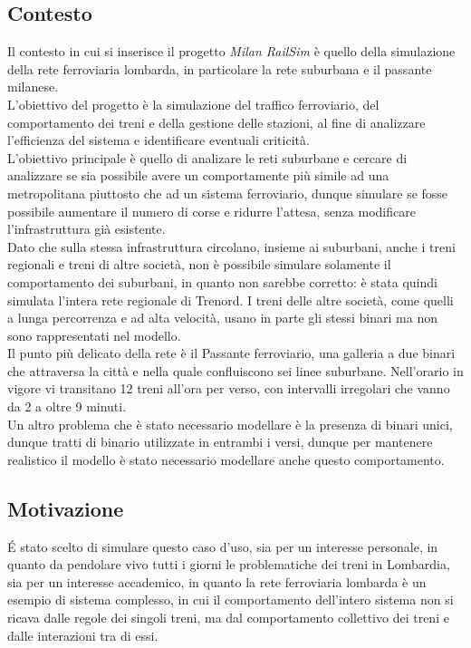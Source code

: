 \subsection{Contesto}
Il contesto in cui si inserisce il progetto \textit{Milan RailSim} è quello della simulazione della rete ferroviaria lombarda, in particolare la rete suburbana e il passante milanese. \\
L'obiettivo del progetto è la simulazione del traffico ferroviario, del comportamento dei treni e della gestione delle stazioni, al fine di analizzare l'efficienza del sistema e identificare eventuali criticità.\\
L'obiettivo principale è quello di analizare le reti suburbane e cercare di analizzare se sia possibile avere un comportamente più simile ad una metropolitana piuttosto che ad un sistema ferroviario, dunque simulare se fosse possibile aumentare il numero di corse e ridurre l'attesa, senza modificare l'infrastruttura già esistente.\\
Dato che sulla stessa infrastruttura circolano, insieme ai suburbani, anche i treni regionali e treni di altre società, non è possibile simulare solamente il comportamento dei suburbani, in quanto non sarebbe corretto: è stata quindi simulata l'intera rete regionale di Trenord. I treni delle altre società, come quelli a lunga percorrenza e ad alta velocità, usano in parte gli stessi binari ma non sono rappresentati nel modello.\\
Il punto più delicato della rete è il Passante ferroviario, una galleria a due binari che attraversa la città e nella quale confluiscono sei linee suburbane. Nell'orario in vigore vi transitano 12 treni all'ora per verso, con intervalli irregolari che vanno da 2 a oltre 9 minuti.\\
Un altro problema che è stato necessario modellare è la presenza di binari unici, dunque tratti di binario utilizzate in entrambi i versi, dunque per mantenere realistico il modello è stato necessario modellare anche questo comportamento.\\

\subsection{Motivazione}
\'E stato scelto di simulare questo caso d'uso, sia per un interesse personale, in quanto da pendolare vivo tutti i giorni le problematiche dei treni in Lombardia, sia per un interesse accademico, in quanto la rete ferroviaria lombarda è un esempio di sistema complesso, in cui il comportamento dell'intero sistema non si ricava dalle regole dei singoli treni, ma dal comportamento collettivo dei treni e dalle interazioni tra di essi.\\

